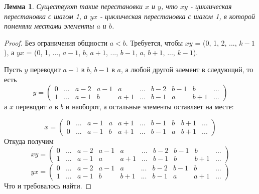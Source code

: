 \documentclass{article}
\newtheorem{lemma}{Лемма}
\begin{document}
	\begin{lemma}
		Существуют такие перестановки $x$ и $y$, что $xy$ - циклическая перестановка с шагом 1, а $yx$ - циклическая перестановка с шагом 1, в которой поменяли местами элементы $a$ и $b$.
	\end{lemma}
	\begin{proof}
		Без ограничения общности $a < b$.
		Требуется, чтобы $xy$ = (0, 1, 2, ..., $k-1$), а $yx$ = (0, 1, ..., $a-1$, $b$, $a+1$, ..., $b-1$, $a$, $b+1$, ..., $k-1$).
		
		Пусть $y$ переводит $a-1$ в $b$, $b-1$ в $a$, а любой другой элемент в следующий, то есть
		$$
		y = 
		\begin{pmatrix}
			0&...&a-2&a-1&a&...&b-2&b-1&b&...\\
			1&...&a-1&b&a+1&...&b-1&a&b+1&...
		\end{pmatrix}
		$$
		а $x$ переводит $a$ в $b$ и наоборот, а остальные элементы оставляет на месте:
		
		$$
		x = 
		\begin{pmatrix}
			0&...&a-1&a&a+1&...&b-1&b&b+1&...\\
			0&...&a-1&b&a+1&...&b-1&a&b+1&...
		\end{pmatrix}
		$$
		Откуда получим 
		$$
		xy = 
		\begin{pmatrix}
			0&...&a-2&a-1&a&...&b-2&b-1&b&...\\
			1&...&a-1&a&a+1&...&b-1&b&b+1&...
		\end{pmatrix}
		$$
		$$
		yx = 
		\begin{pmatrix}
			0&...&a-2&a-1&a&...&b-2&b-1&b&...\\
			1&...&a-1&b&b+1&...&b-1&a&a+1&...
		\end{pmatrix}
		$$
		Что и требовалось найти.
	\end{proof}
\end{document}
